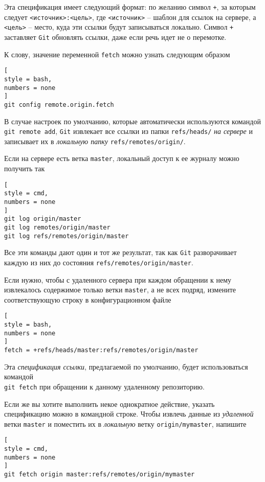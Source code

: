 \documentclass[%
	11pt,
	a4paper,
	utf8,
		]{article}
\begin{document}
Эта спецификация имеет следующий формат: по желанию символ \texttt{+}, за которым следует \verb|<источник>:<цель>|, где \verb|<источник>| -- шаблон для ссылок на сервере, а \verb|<цель>| -- место, куда эти ссылки будут записываться локально. Символ \texttt{+} заставляет \texttt{Git} обновлять ссылки, даже если речь идет не о перемотке.

К слову, значение переменной \texttt{fetch} можно узнать следующим образом
\begin{lstlisting}[
style = bash,
numbers = none
]
git config remote.origin.fetch
\end{lstlisting}

В случае настроек по умолчанию, которые автоматически используются командой \verb|git remote add|, \texttt{Git} извлекает все ссылки из папки \verb|refs/heads/| \emph{на сервере} и записывает их в \emph{локальную папку} \verb|refs/remotes/origin/|.

Если на сервере есть ветка \texttt{master}, локальный доступ к ее журналу можно получить так
\begin{lstlisting}[
style = cmd,
numbers = none
]
git log origin/master
git log remotes/origin/master
git log refs/remotes/origin/master
\end{lstlisting}

Все эти команды дают один и тот же результат, так как \texttt{Git} разворачивает каждую из них до состояния \verb|refs/remotes/origin/master|.

Если нужно, чтобы с удаленного сервера при каждом обращении к нему извлекалось содержимое только ветки \texttt{master}, а не всех подряд, измените соответствующую строку в конфигурационном файле
\begin{lstlisting}[
style = bash,
numbers = none
]
fetch = +refs/heads/master:refs/remotes/origin/master
\end{lstlisting}

{\color{blue} Эта \emph{спецификация ссылки}, предлагаемой по умолчанию, будет использоваться командой\\\texttt{git fetch} при обращении к данному удаленному репозиторию.}

Если же вы хотите выполнить некое однократное действие, указать спецификацию можно в командной строке. Чтобы извлечь данные из \emph{удаленной} ветки \texttt{master} и поместить их в \emph{локальную} ветку \verb|origin/mymaster|, напишите
\begin{lstlisting}[
style = cmd,
numbers = none
]
git fetch origin master:refs/remotes/origin/mymaster
\end{lstlisting}
\end{document}
